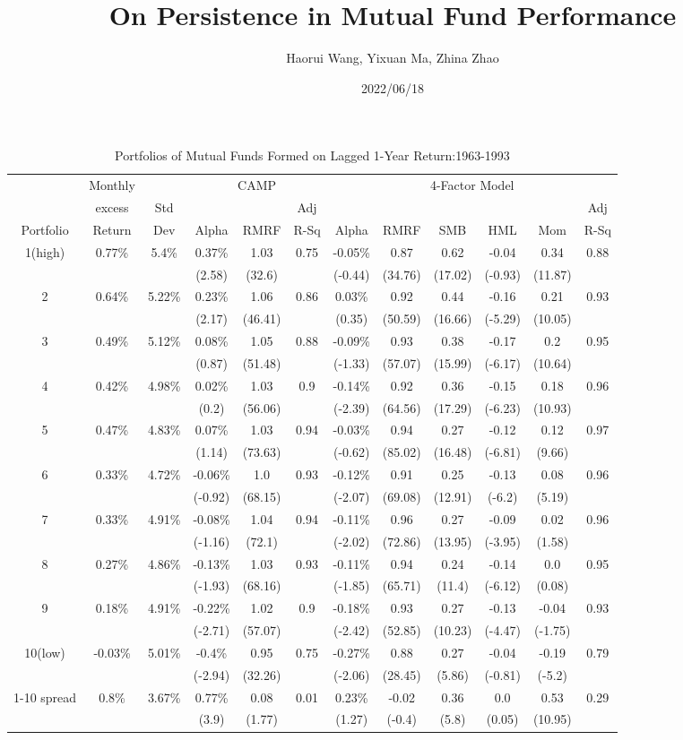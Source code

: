 \documentclass[a4paper]{article}
\title{On Persistence in Mutual Fund Performance}
\author{Haorui Wang, Yixuan Ma, Zhina Zhao}
\date{2022/06/18}
\begin{document}
\maketitle
\begin{table}[h!]
\centering
\begin{tabular}{c cc ccc cccccc} 
\toprule[1.5pt]
  &  Monthly &  & \multicolumn{3}{c}{CAMP} &  \multicolumn{6}{c}{4-Factor Model}\\
  & excess& Std &   &  & Adj &   &  &  &  &  & Adj\\
 Portfolio & Return & Dev & Alpha  & RMRF & R-Sq &  Alpha  & RMRF & SMB & HML & Mom &  R-Sq\\

\toprule[1.5pt]
1(high)&0.77\%&5.4\%&0.37\%&1.03&0.75&-0.05\%&0.87&0.62&-0.04&0.34&0.88\\
&&&(2.58)&(32.6)&&(-0.44)&(34.76)&(17.02)&(-0.93)&(11.87)&\\
2&0.64\%&5.22\%&0.23\%&1.06&0.86&0.03\%&0.92&0.44&-0.16&0.21&0.93\\
&&&(2.17)&(46.41)&&(0.35)&(50.59)&(16.66)&(-5.29)&(10.05)&\\
3&0.49\%&5.12\%&0.08\%&1.05&0.88&-0.09\%&0.93&0.38&-0.17&0.2&0.95\\
&&&(0.87)&(51.48)&&(-1.33)&(57.07)&(15.99)&(-6.17)&(10.64)&\\
4&0.42\%&4.98\%&0.02\%&1.03&0.9&-0.14\%&0.92&0.36&-0.15&0.18&0.96\\
&&&(0.2)&(56.06)&&(-2.39)&(64.56)&(17.29)&(-6.23)&(10.93)&\\
5&0.47\%&4.83\%&0.07\%&1.03&0.94&-0.03\%&0.94&0.27&-0.12&0.12&0.97\\
&&&(1.14)&(73.63)&&(-0.62)&(85.02)&(16.48)&(-6.81)&(9.66)&\\
6&0.33\%&4.72\%&-0.06\%&1.0&0.93&-0.12\%&0.91&0.25&-0.13&0.08&0.96\\
&&&(-0.92)&(68.15)&&(-2.07)&(69.08)&(12.91)&(-6.2)&(5.19)&\\
7&0.33\%&4.91\%&-0.08\%&1.04&0.94&-0.11\%&0.96&0.27&-0.09&0.02&0.96\\
&&&(-1.16)&(72.1)&&(-2.02)&(72.86)&(13.95)&(-3.95)&(1.58)&\\
8&0.27\%&4.86\%&-0.13\%&1.03&0.93&-0.11\%&0.94&0.24&-0.14&0.0&0.95\\
&&&(-1.93)&(68.16)&&(-1.85)&(65.71)&(11.4)&(-6.12)&(0.08)&\\
9&0.18\%&4.91\%&-0.22\%&1.02&0.9&-0.18\%&0.93&0.27&-0.13&-0.04&0.93\\
&&&(-2.71)&(57.07)&&(-2.42)&(52.85)&(10.23)&(-4.47)&(-1.75)&\\
10(low)&-0.03\%&5.01\%&-0.4\%&0.95&0.75&-0.27\%&0.88&0.27&-0.04&-0.19&0.79\\
&&&(-2.94)&(32.26)&&(-2.06)&(28.45)&(5.86)&(-0.81)&(-5.2)&\\
1-10 spread&0.8\%&3.67\%&0.77\%&0.08&0.01&0.23\%&-0.02&0.36&0.0&0.53&0.29\\
&&&(3.9)&(1.77)&&(1.27)&(-0.4)&(5.8)&(0.05)&(10.95)&\\

\toprule[1.5pt]
\end{tabular}
\caption{Portfolios of Mutual Funds Formed on Lagged 1-Year Return:1963-1993}
\label{table:1}
\end{table}
     
\end{document}
